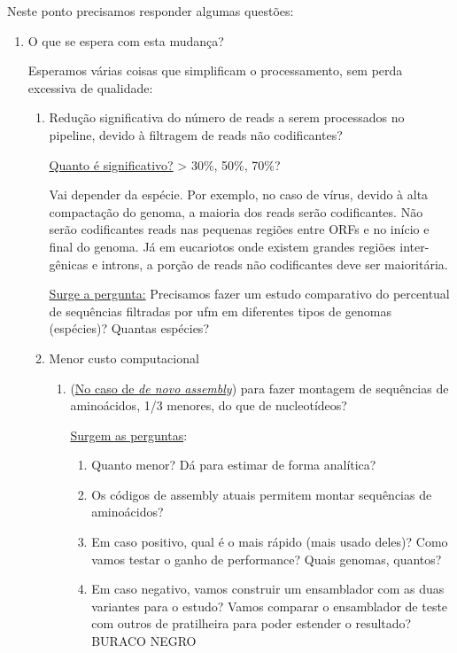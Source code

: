 \documentclass[12pt]{article}
\begin{document}
Neste ponto precisamos responder algumas questões:

\begin{enumerate}
    \item O que se espera com esta mudança?

          Esperamos várias coisas que simplificam o processamento, sem perda excessiva de qualidade:

          \begin{enumerate}
              \item Redução significativa do número de reads a serem processados no pipeline, devido à filtragem de reads não codificantes?

                    \underline{Quanto é significativo?} > 30\%, 50\%, 70\%?

                    Vai depender da espécie. Por exemplo, no caso de vírus, devido à alta compactação do genoma, a maioria dos reads serão codificantes. Não serão codificantes reads nas pequenas regiões entre ORFs e no início e final do genoma. Já em eucariotos onde existem grandes regiões inter-gênicas e introns, a porção de reads não codificantes deve ser maioritária.

                    \underline{Surge a pergunta:} Precisamos fazer um estudo comparativo do percentual de sequências filtradas por \gls{ufm} em diferentes tipos de genomas (espécies)? Quantas espécies?

              \item Menor custo computacional

                    \begin{enumerate}
                        \item (\underline{No caso de {\it{de novo assembly}}}) para fazer montagem de sequências de aminoácidos, 1/3 menores, do que de nucleotídeos?

                              \underline{Surgem as perguntas}:
                              \begin{enumerate}
                                  \item Quanto menor? Dá para estimar de forma analítica?
                                  \item Os códigos de assembly atuais permitem montar sequências de aminoácidos?
                                  \item Em caso positivo, qual é o mais rápido (mais usado deles)? Como vamos testar o ganho de performance? Quais genomas, quantos?
                                  \item Em caso negativo, vamos construir um ensamblador com as duas variantes para o estudo? Vamos comparar o ensamblador de teste com outros de pratilheira para poder estender o resultado? BURACO NEGRO
                              \end{enumerate}


\end{enumerate}
\end{enumerate}
\end{enumerate}
\end{document}
